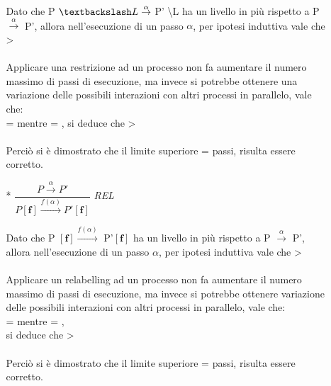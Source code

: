 \begin{itemize}
\begin{itemize}
			Dato che P $\textbackslash L \overset{\alpha}\rightarrow $ P' \textbackslash L ha un livello in più rispetto a P $\overset{\alpha}\rightarrow$ P', allora nell'esecuzione di un passo $\alpha$, per ipotesi induttiva vale che  >   \\
			\\
			Applicare una restrizione ad un processo non fa aumentare il numero massimo di passi di esecuzione, ma invece si potrebbe ottenere una variazione delle possibili interazioni con altri processi in parallelo, vale che:\\  =  mentre  = , si deduce che  > \\
			\\
		Perciò si è dimostrato che il limite superiore  =  passi, risulta essere corretto.
		\\
			
		\item[*]
			$\dfrac{P \overset{\alpha}\rightarrow P'}{P \mathbf{[f]} \overset{f(\alpha)}\rightarrow P'\mathbf{[f]}}$ \textit{REL} 
			
			Dato che P $\mathbf{[f]} \overset{f(\alpha)}\rightarrow$ P'$\mathbf{[f]}$ ha un livello in più rispetto a P $\overset{\alpha}\rightarrow$ P', allora nell'esecuzione di un passo $\alpha$, per ipotesi induttiva vale che  >   \\
			\\
			Applicare un relabelling ad un processo non fa aumentare il numero massimo di passi di esecuzione, ma invece si potrebbe ottenere variazione delle possibili interazioni con altri processi in parallelo, vale che:\\  =  mentre  = ,\\ si deduce che  > \\
			\\
		Perciò si è dimostrato che il limite superiore  =  passi, risulta essere corretto.	
				
	\end{itemize}

	
\end{itemize}


